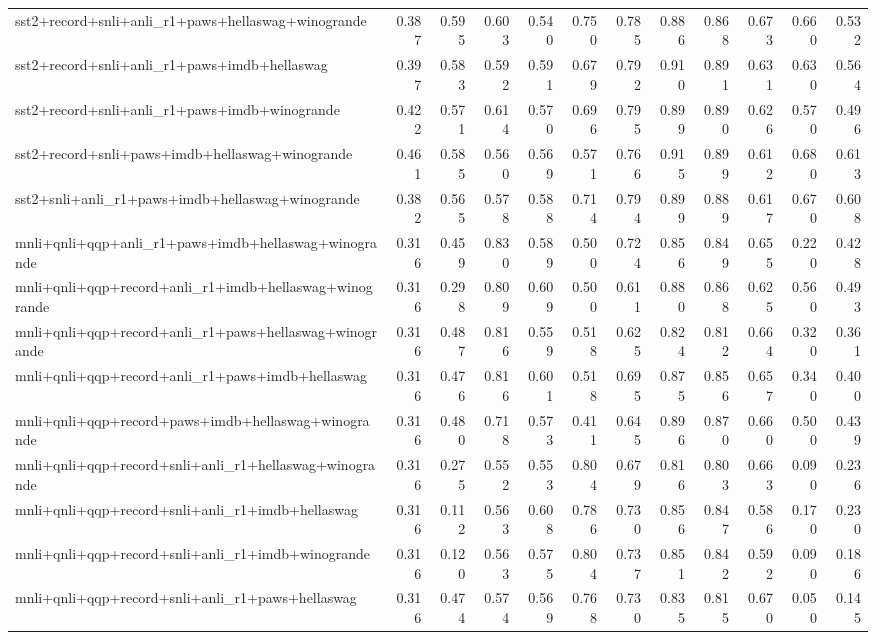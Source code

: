 \begin{table}[t]
\begin{tabular}{lrrrrrrrrrrr}
    sst2+record+snli+anli\_r1+paws+hellaswag+winogrande & 0.387 & 0.595 & 0.603 & 0.540 & 0.750 & 0.785 & 0.886 & 0.868 & 0.673 & 0.660 & 0.532 \\
    sst2+record+snli+anli\_r1+paws+imdb+hellaswag & 0.397 & 0.583 & 0.592 & 0.591 & 0.679 & 0.792 & 0.910 & 0.891 & 0.631 & 0.630 & 0.564 \\
    sst2+record+snli+anli\_r1+paws+imdb+winogrande & 0.422 & 0.571 & 0.614 & 0.570 & 0.696 & 0.795 & 0.899 & 0.890 & 0.626 & 0.570 & 0.496 \\
    sst2+record+snli+paws+imdb+hellaswag+winogrande & 0.461 & 0.585 & 0.560 & 0.569 & 0.571 & 0.766 & 0.915 & 0.899 & 0.612 & 0.680 & 0.613 \\
    sst2+snli+anli\_r1+paws+imdb+hellaswag+winogrande & 0.382 & 0.565 & 0.578 & 0.588 & 0.714 & 0.794 & 0.899 & 0.889 & 0.617 & 0.670 & 0.608 \\
    \addlinespace
    mnli+qnli+qqp+anli\_r1+paws+imdb+hellaswag+winogrande & 0.316 & 0.459 & 0.830 & 0.589 & 0.500 & 0.724 & 0.856 & 0.849 & 0.655 & 0.220 & 0.428 \\
    mnli+qnli+qqp+record+anli\_r1+imdb+hellaswag+winogrande & 0.316 & 0.298 & 0.809 & 0.609 & 0.500 & 0.611 & 0.880 & 0.868 & 0.625 & 0.560 & 0.493 \\
    mnli+qnli+qqp+record+anli\_r1+paws+hellaswag+winogrande & 0.316 & 0.487 & 0.816 & 0.559 & 0.518 & 0.625 & 0.824 & 0.812 & 0.664 & 0.320 & 0.361 \\
    mnli+qnli+qqp+record+anli\_r1+paws+imdb+hellaswag & 0.316 & 0.476 & 0.816 & 0.601 & 0.518 & 0.695 & 0.875 & 0.856 & 0.657 & 0.340 & 0.400 \\
    mnli+qnli+qqp+record+paws+imdb+hellaswag+winogrande & 0.316 & 0.480 & 0.718 & 0.573 & 0.411 & 0.645 & 0.896 & 0.870 & 0.660 & 0.500 & 0.439 \\
    mnli+qnli+qqp+record+snli+anli\_r1+hellaswag+winogrande & 0.316 & 0.275 & 0.552 & 0.553 & 0.804 & 0.679 & 0.816 & 0.803 & 0.663 & 0.090 & 0.236 \\
    mnli+qnli+qqp+record+snli+anli\_r1+imdb+hellaswag & 0.316 & 0.112 & 0.563 & 0.608 & 0.786 & 0.730 & 0.856 & 0.847 & 0.586 & 0.170 & 0.230 \\
    mnli+qnli+qqp+record+snli+anli\_r1+imdb+winogrande & 0.316 & 0.120 & 0.563 & 0.575 & 0.804 & 0.737 & 0.851 & 0.842 & 0.592 & 0.090 & 0.186 \\
    mnli+qnli+qqp+record+snli+anli\_r1+paws+hellaswag & 0.316 & 0.474 & 0.574 & 0.569 & 0.768 & 0.730 & 0.835 & 0.815 & 0.670 & 0.050 & 0.145 \\

\end{tabular}
\end{table}
